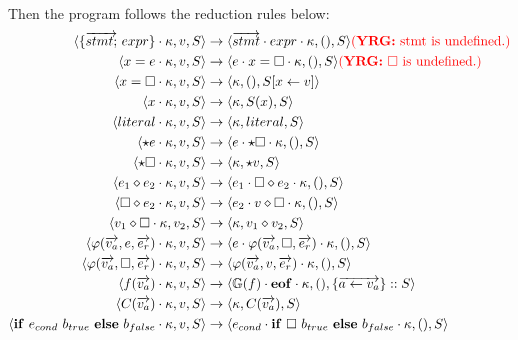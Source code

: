 \documentclass[a4paper,11pt]{article}
\newcommand\rtstate[3]{\langle #1, #2, #3\rangle}
\newcommand\yrg[1]{{\color{red}{(\textbf{YRG:} #1)}}}
\begin{document}
Then the program follows the reduction rules below:
\begin{align*}
\rtstate{\{\overrightarrow{stmt;}\ expr\} \cdot \kappa}{v}{S} &\rightarrow \rtstate{\overrightarrow{stmt} \cdot expr \cdot \kappa}{()}{S}
\textrm{\yrg{stmt is undefined.}}
\\
\rtstate{x = e \cdot \kappa}{v}{S} &\rightarrow \rtstate{e \cdot x = \square \cdot \kappa}{()}{S}
\textrm{\yrg{$\square$ is undefined.}}
\\
\rtstate{x = \square \cdot \kappa}{v}{S} &\rightarrow \rtstate{\kappa}{()}{S[x \leftarrow v]}\\
\rtstate{x \cdot \kappa}{v}{S} &\rightarrow \rtstate{\kappa}{S(x)}{S}\\
\rtstate{literal \cdot \kappa}{v}{S} &\rightarrow \rtstate{\kappa}{literal}{S}\\
\rtstate{\star e \cdot \kappa}{v}{S} &\rightarrow \rtstate{e \cdot \star \square \cdot \kappa}{()}{S}\\
\rtstate{\star \square \cdot \kappa}{v}{S} &\rightarrow \rtstate{\kappa}{\star v}{S}\\
\rtstate{e_1 \diamond e_2 \cdot \kappa}{v}{S} &\rightarrow \rtstate{e_1 \cdot \square \diamond e_2 \cdot \kappa}{()}{S}\\
\rtstate{\square \diamond e_2 \cdot \kappa}{v}{S} &\rightarrow \rtstate{e_2 \cdot v \diamond \square \cdot \kappa}{()}{S}\\
\rtstate{v_1 \diamond \square \cdot \kappa}{v_2}{S} &\rightarrow \rtstate{\kappa}{v_1 \diamond v_2}{S}\\
\rtstate{\varphi(\overrightarrow{v_a}, e, \overrightarrow{e_r}) \cdot \kappa}{v}{S} &\rightarrow \rtstate{e \cdot \varphi(\overrightarrow{v_a}, \square, \overrightarrow{e_r}) \cdot \kappa}{()}{S}\\
\rtstate{\varphi(\overrightarrow{v_a}, \square, \overrightarrow{e_r}) \cdot \kappa}{v}{S} &\rightarrow \rtstate{\varphi(\overrightarrow{v_a}, v, \overrightarrow{e_r}) \cdot \kappa}{()}{S}\\
\rtstate{f(\overrightarrow{v_a}) \cdot \kappa}{v}{S} &\rightarrow \rtstate{\mathbb{G}(f) \cdot \mathbf{eof} \cdot \kappa}{()}{\{\overrightarrow{a \leftarrow v_a}\} :: S}\\
\rtstate{C(\overrightarrow{v_a}) \cdot \kappa}{v}{S} &\rightarrow \rtstate{\kappa}{C(\overrightarrow{v_a})}{S}\\
\rtstate{\mathbf{if}\ e_{cond}\ b_{true}\ \mathbf{else}\ b_{false} \cdot  \kappa}{v}{S} &\rightarrow \rtstate{e_{cond} \cdot \mathbf{if}\ \square\ b_{true}\ \mathbf{else}\ b_{false} \cdot \kappa}{()}{S}\\

\end{align*}
\end{document}
